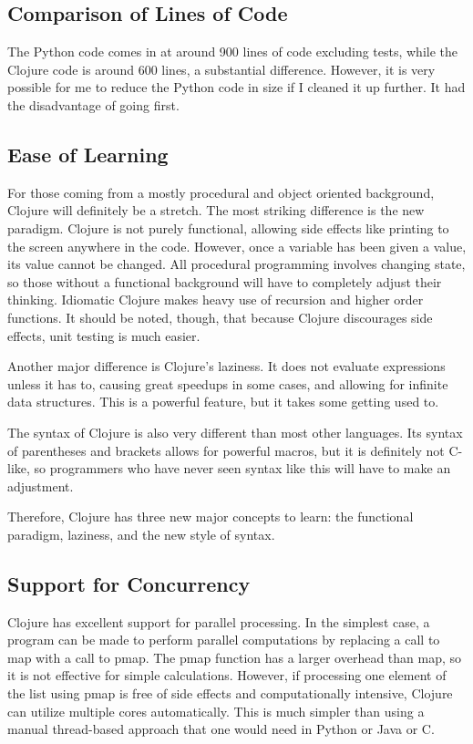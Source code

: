 \documentclass{article}
\begin{document}
\subsection{Comparison of Lines of Code}

The Python code comes in at around 900 lines of code excluding tests, while the Clojure code is around 600 lines, a substantial difference.  However, it is very possible for me to reduce the Python code in size if I cleaned it up further.  It had the disadvantage of going first.  

\subsection{Ease of Learning}

For those coming from a mostly procedural and object oriented background, Clojure will definitely be a stretch.  The most striking difference is the new paradigm.  Clojure is not purely functional, allowing side effects like printing to the screen anywhere in the code.  However, once a variable has been given a value, its value cannot be changed.  All procedural programming involves changing state, so those without a functional background will have to completely adjust their thinking.  Idiomatic Clojure makes heavy use of recursion and higher order functions.  It should be noted, though, that because Clojure discourages side effects, unit testing is much easier.

Another major difference is Clojure's laziness.  It does not evaluate expressions unless it has to, causing great speedups in some cases, and allowing for infinite data structures.  This is a powerful feature, but it takes some getting used to.  

The syntax of Clojure is also very different than most other languages.  Its syntax of parentheses and brackets allows for powerful macros, but it is definitely not C-like, so programmers who have never seen syntax like this will have to make an adjustment.

Therefore, Clojure has three new major concepts to learn: the functional paradigm, laziness, and the new style of syntax.

\subsection{Support for Concurrency}

Clojure has excellent support for parallel processing.  In the simplest case, a program can be made to perform parallel computations by replacing a call to map with a call to pmap.  The pmap function has a larger overhead than map, so it is not effective for simple calculations.  However, if processing one element of the list using pmap is free of side effects and computationally intensive, Clojure can utilize multiple cores automatically.  This is much simpler than using a manual thread-based approach that one would need in Python or Java or C.
\end{document}
